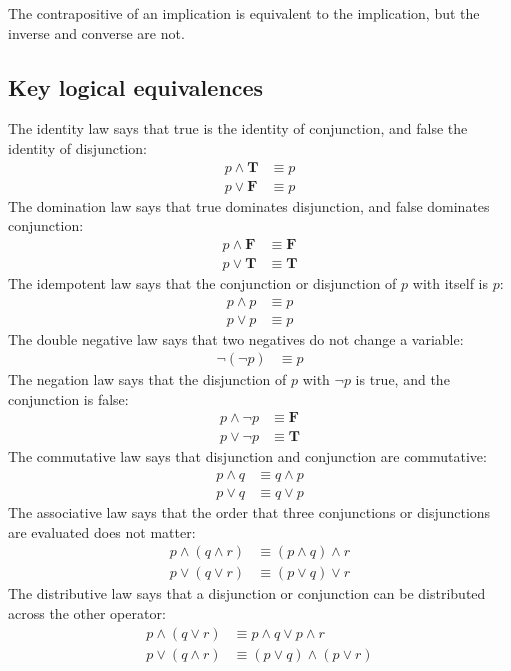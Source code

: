 The contrapositive of an implication is equivalent to the implication, but the inverse and converse are not.

\subsection{Key logical equivalences}
The identity law says that true is the identity of conjunction, and false the identity of disjunction:
\begin{align}
    p \land \mathbf{T} & \equiv p \\
    p \lor \mathbf{F}  & \equiv p
\end{align}
The domination law says that true dominates disjunction, and false dominates conjunction:
\begin{align}
    p \land \mathbf{F} & \equiv \mathbf{F} \\
    p \lor \mathbf{T}  & \equiv \mathbf{T}
\end{align}
The idempotent law says that the conjunction or disjunction of \(p\) with itself is \(p\):
\begin{align}
    p \land p & \equiv p \\
    p \lor p  & \equiv p
\end{align}
The double negative law says that two negatives do not change a variable:
\begin{align}
    \neg(\neg p) & \equiv p
\end{align}
The negation law says that the disjunction of \(p\) with \(\neg p\) is true, and the conjunction is false:
\begin{align}
    p \land \neg p & \equiv \mathbf{F} \\
    p \lor \neg p  & \equiv \mathbf{T}
\end{align}
The commutative law says that disjunction and conjunction are commutative:
\begin{align}
    p \land q & \equiv q \land p \\
    p \lor q  & \equiv q \lor p
\end{align}
The associative law says that the order that three conjunctions or disjunctions are evaluated does not matter:
\begin{align}
    p \land (q \land r) & \equiv (p \land q) \land r \\
    p \lor (q \lor r)   & \equiv (p \lor q) \lor r
\end{align}
The distributive law says that a disjunction or conjunction can be distributed across the other operator:
\begin{align}
    p \land (q \lor r) & \equiv p \land q \lor p \land r    \\
    p \lor (q \land r) & \equiv (p \lor q) \land (p \lor r)
\end{align}

